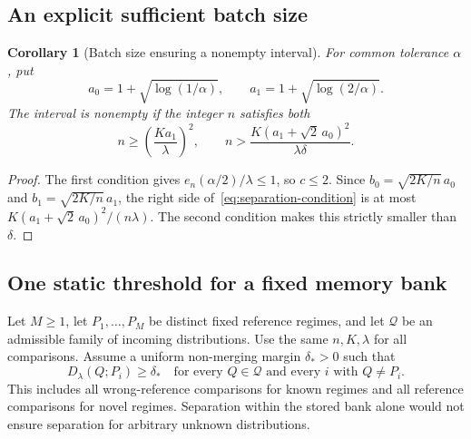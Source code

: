 \documentclass[11pt,a4paper]{article}
\newtheorem{corollary}[theorem]{Corollary}
\theoremstyle{definition}
\theoremstyle{remark}
\begin{document}
\subsection{An explicit sufficient batch size}
\begin{corollary}[Batch size ensuring a nonempty interval]\label{cor:sample-size}
For common tolerance $\alpha$, put
\[
 a_0=1+\sqrt{\log(1/\alpha)},\qquad
 a_1=1+\sqrt{\log(2/\alpha)}.
\]
The interval is nonempty if the integer $n$ satisfies both
\begin{equation}\label{eq:batch-size}
 n\ge\left(\frac{Ka_1}{\lambda}\right)^2,
 \qquad n>\frac{K(a_1+\sqrt2\,a_0)^2}{\lambda\delta}.
\end{equation}
\end{corollary}
\begin{proof}
The first condition gives $e_n(\alpha/2)/\lambda\le1$, so $c\le2$.
Since $b_0=\sqrt{2K/n}\,a_0$ and $b_1=\sqrt{2K/n}\,a_1$, the
right side of~\eqref{eq:separation-condition} is at most
$K(a_1+\sqrt2\,a_0)^2/(n\lambda)$. The second condition makes this
strictly smaller than $\delta$.
\end{proof}

\subsection{One static threshold for a fixed memory bank}\label{sec:bank}
Let $M\ge1$, let $P_1,\ldots,P_M$ be distinct fixed reference regimes, and let
$\mathcal Q$ be an admissible family of incoming distributions.
Use the same $n,K,\lambda$ for all comparisons. Assume a uniform
non-merging margin $\delta_*>0$ such that
\begin{equation}\label{eq:bank-separation}
 D_\lambda(Q;P_i)\ge\delta_*
 \quad\text{for every }Q\in\mathcal Q
 \text{ and every }i\text{ with }Q\ne P_i.
\end{equation}
This includes all wrong-reference comparisons for known regimes
and all reference comparisons for novel regimes. Separation within
the stored bank alone would not ensure separation for arbitrary
unknown distributions.
\end{document}
